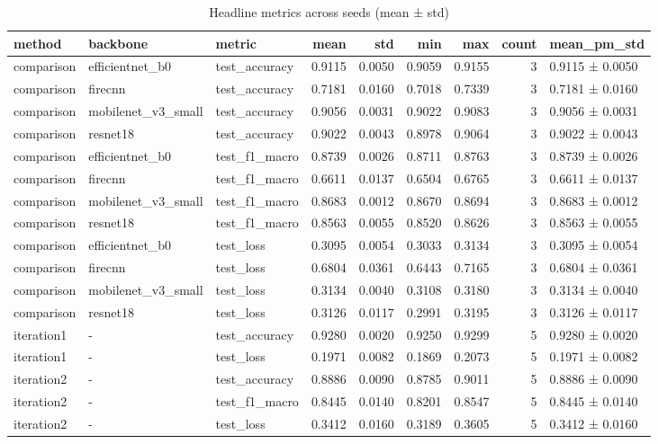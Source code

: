 \begin{table}
\caption{Headline metrics across seeds (mean ± std)}
\begin{tabular}{lllrrrrrl}
\toprule
method & backbone & metric & mean & std & min & max & count & mean\_pm\_std \\
\midrule
comparison & efficientnet\_b0 & test\_accuracy & 0.9115 & 0.0050 & 0.9059 & 0.9155 & 3 & 0.9115 ± 0.0050 \\
comparison & firecnn & test\_accuracy & 0.7181 & 0.0160 & 0.7018 & 0.7339 & 3 & 0.7181 ± 0.0160 \\
comparison & mobilenet\_v3\_small & test\_accuracy & 0.9056 & 0.0031 & 0.9022 & 0.9083 & 3 & 0.9056 ± 0.0031 \\
comparison & resnet18 & test\_accuracy & 0.9022 & 0.0043 & 0.8978 & 0.9064 & 3 & 0.9022 ± 0.0043 \\
comparison & efficientnet\_b0 & test\_f1\_macro & 0.8739 & 0.0026 & 0.8711 & 0.8763 & 3 & 0.8739 ± 0.0026 \\
comparison & firecnn & test\_f1\_macro & 0.6611 & 0.0137 & 0.6504 & 0.6765 & 3 & 0.6611 ± 0.0137 \\
comparison & mobilenet\_v3\_small & test\_f1\_macro & 0.8683 & 0.0012 & 0.8670 & 0.8694 & 3 & 0.8683 ± 0.0012 \\
comparison & resnet18 & test\_f1\_macro & 0.8563 & 0.0055 & 0.8520 & 0.8626 & 3 & 0.8563 ± 0.0055 \\
comparison & efficientnet\_b0 & test\_loss & 0.3095 & 0.0054 & 0.3033 & 0.3134 & 3 & 0.3095 ± 0.0054 \\
comparison & firecnn & test\_loss & 0.6804 & 0.0361 & 0.6443 & 0.7165 & 3 & 0.6804 ± 0.0361 \\
comparison & mobilenet\_v3\_small & test\_loss & 0.3134 & 0.0040 & 0.3108 & 0.3180 & 3 & 0.3134 ± 0.0040 \\
comparison & resnet18 & test\_loss & 0.3126 & 0.0117 & 0.2991 & 0.3195 & 3 & 0.3126 ± 0.0117 \\
iteration1 & - & test\_accuracy & 0.9280 & 0.0020 & 0.9250 & 0.9299 & 5 & 0.9280 ± 0.0020 \\
iteration1 & - & test\_loss & 0.1971 & 0.0082 & 0.1869 & 0.2073 & 5 & 0.1971 ± 0.0082 \\
iteration2 & - & test\_accuracy & 0.8886 & 0.0090 & 0.8785 & 0.9011 & 5 & 0.8886 ± 0.0090 \\
iteration2 & - & test\_f1\_macro & 0.8445 & 0.0140 & 0.8201 & 0.8547 & 5 & 0.8445 ± 0.0140 \\
iteration2 & - & test\_loss & 0.3412 & 0.0160 & 0.3189 & 0.3605 & 5 & 0.3412 ± 0.0160 \\

\end{tabular}
\end{table}
